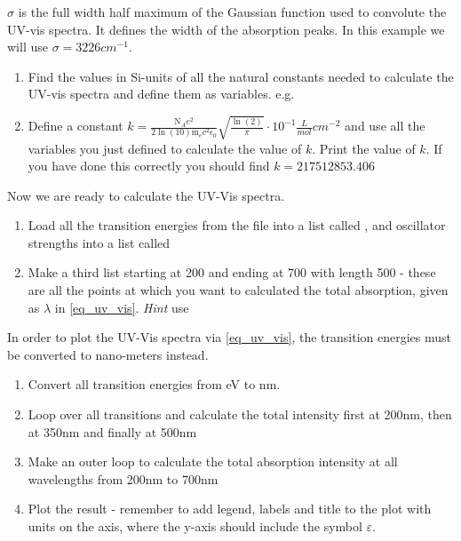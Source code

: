 \documentclass{article}
\begin{document}
$\sigma$ is the full width half maximum of the Gaussian function used to convolute the UV-vis spectra. It defines the width of the absorption peaks. In this example we will use $\sigma = 3226 \si{cm^{-1}}$.
\begin{enumerate}
\item Find the values in Si-units of all the natural constants needed to calculate the UV-vis spectra and define them as variables. e.g. \\

\item Define a constant $k=\frac{\text{N}_A\si{e^2}}{2\ln(10) \text{m}_e \si{c^2}  \epsilon_0}\sqrt{\frac{\ln(2)}{\pi}}\cdot 10^{-1} \frac{\si{L}}{\si{mol}}\si{cm^{-2}}$ and use all the variables you just defined to calculate the value of $k$. Print the value of $k$. If you have done this correctly you should find
$k=217512853.406$
\end{enumerate}

Now we are ready to calculate the UV-Vis spectra. 
\begin{enumerate}[resume]
\item Load all the transition energies from the file  into a list called , and oscillator strengths into a list called 
\item Make a third list  starting at 200 and ending at 700 with length 500 - these are all the points at which you want to calculated the total absorption, given as $\lambda$ in \eqref{eq_uv_vis}. \textit{Hint} use 
\end{enumerate}

In order to plot the UV-Vis spectra via \eqref{eq_uv_vis}, the transition energies must be converted to nano-meters instead.

\begin{enumerate}[resume]
\item Convert all transition energies from eV to nm.
\item Loop over all transitions and calculate the total intensity first at 200nm, then at 350nm and finally at 500nm

\item Make an outer loop to calculate the total absorption intensity at all wavelengths from 200nm to 700nm \label{outerloop}
\item Plot the result - remember to add legend, labels and title to the plot with units on the axis, where the y-axis should include the symbol $\varepsilon$.

\end{enumerate}
\end{document}
